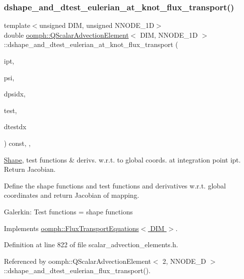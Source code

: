 \subsubsection{\texorpdfstring{dshape\+\_\+and\+\_\+dtest\+\_\+eulerian\+\_\+at\+\_\+knot\+\_\+flux\+\_\+transport()}{dshape\_and\_dtest\_eulerian\_at\_knot\_flux\_transport()}}
{\footnotesize\ttfamily template$<$unsigned D\+IM, unsigned N\+N\+O\+D\+E\+\_\+1D$>$ \\
double \hyperlink{classoomph_1_1QScalarAdvectionElement}{oomph\+::\+Q\+Scalar\+Advection\+Element}$<$ D\+IM, N\+N\+O\+D\+E\+\_\+1D $>$\+::dshape\+\_\+and\+\_\+dtest\+\_\+eulerian\+\_\+at\+\_\+knot\+\_\+flux\+\_\+transport (\begin{DoxyParamCaption}\item[{const unsigned \&}]{ipt,  }\item[{\hyperlink{classoomph_1_1Shape}{Shape} \&}]{psi,  }\item[{\hyperlink{classoomph_1_1DShape}{D\+Shape} \&}]{dpsidx,  }\item[{\hyperlink{classoomph_1_1Shape}{Shape} \&}]{test,  }\item[{\hyperlink{classoomph_1_1DShape}{D\+Shape} \&}]{dtestdx }\end{DoxyParamCaption}) const\hspace{0.3cm}{\ttfamily [inline]}, {\ttfamily [protected]}, {\ttfamily [virtual]}}



\hyperlink{classoomph_1_1Shape}{Shape}, test functions \& derivs. w.\+r.\+t. to global coords. at integration point ipt. Return Jacobian. 

Define the shape functions and test functions and derivatives w.\+r.\+t. global coordinates and return Jacobian of mapping.

Galerkin\+: Test functions = shape functions 

Implements \hyperlink{classoomph_1_1FluxTransportEquations_a21e7b05ac839ce2db818356ee6906e1c}{oomph\+::\+Flux\+Transport\+Equations$<$ D\+I\+M $>$}.



Definition at line 822 of file scalar\+\_\+advection\+\_\+elements.\+h.



Referenced by oomph\+::\+Q\+Scalar\+Advection\+Element$<$ 2, N\+N\+O\+D\+E\+\_\+D $>$\+::dshape\+\_\+and\+\_\+dtest\+\_\+eulerian\+\_\+flux\+\_\+transport().

\mbox{\label{classoomph_1_1QScalarAdvectionElement_a9fb6d850442888b831a409fb41b7d1be}} 
